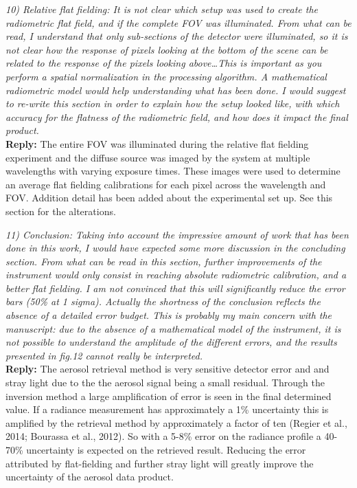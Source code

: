\documentclass[12pt, notitlepage]{article}
\begin{document}
\textit{10) Relative flat fielding: It is not clear which setup was used to create the radiometric
flat field, and if the complete FOV was illuminated. From what can be read, I understand
that only sub-sections of the detector were illuminated, so it is not clear how the
response of pixels looking at the bottom of the scene can be related to the response of
the pixels looking above\ldots This is important as you perform a spatial normalization in
the processing algorithm. A mathematical radiometric model would help understanding
what has been done. I would suggest to re-write this section in order to explain how
the setup looked like, with which accuracy for the flatness of the radiometric field, and
how does it impact the final product.}\\

\textbf{Reply:} The entire FOV was illuminated during the relative flat fielding experiment and the diffuse source was imaged by the system at multiple wavelengths with varying exposure times. These images were used to determine an average flat fielding calibrations for each pixel across the wavelength and FOV. Addition detail has been added about the experimental set up. See this section for the alterations.

\hrulefill

\textit{11) Conclusion: Taking into account the impressive amount of work that has been done
in this work, I would have expected some more discussion in the concluding section.
From what can be read in this section, further improvements of the instrument would
only consist in reaching absolute radiometric calibration, and a better flat fielding. I am
not convinced that this will significantly reduce the error bars (50\% at 1 sigma). Actually
the shortness of the conclusion reflects the absence of a detailed error budget. This is
probably my main concern with the manuscript: due to the absence of a mathematical
model of the instrument, it is not possible to understand the amplitude of the different
errors, and the results presented in fig.12 cannot really be interpreted.}\\

\textbf{Reply:} The aerosol retrieval method is very sensitive detector error and and stray light due to the the aerosol signal being a small residual. Through the inversion method a large amplification of error is seen in the final determined value. If a radiance measurement has approximately a 1\% uncertainty this is amplified by the retrieval method by approximately a factor of ten (Regier et al., 2014; Bourassa et al., 2012). So with a 5-8\% error on the radiance profile a 40-70\% uncertainty is expected on the retrieved result. Reducing the error attributed by flat-fielding and further stray light will greatly improve the uncertainty of the aerosol data product.
\end{document}
